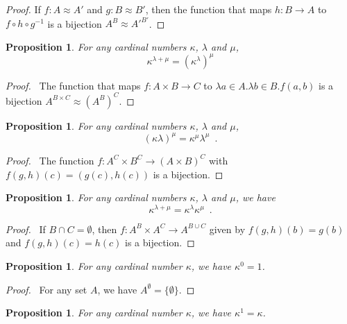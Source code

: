 \documentclass{book}
\let\qed\relax
\newtheorem{prop}[ax]{Proposition}
\theoremstyle{definition}
\begin{document}
\begin{proof}
\pf
If $f : A \approx A'$ and $g : B \approx B'$, then the function that maps $h : B \rightarrow A$ to $f \circ h \circ g^{-1}$ is a bijection $A^B \approx A'^{B'}$. \qed
\end{proof}

\begin{prop}
For any cardinal numbers $\kappa$, $\lambda$ and $\mu$,
\[ \kappa^{\lambda + \mu} = (\kappa^{\lambda})^\mu \]
\end{prop}

\begin{proof}
\pf\ The function that maps $f : A \times B \rightarrow C$ to $\lambda a \in A. \lambda b \in B. f(a,b)$ is a bijection $A^{B \times C} \approx (A^B)^C$. \qed
\end{proof}

\begin{prop}
For any cardinal numbers $\kappa$, $\lambda$ and $\mu$,
\[ (\kappa \lambda)^\mu = \kappa^\mu \lambda^\mu \enspace . \]
\end{prop}

\begin{proof}
\pf\ The function $f : A^C \times B^C \rightarrow (A \times B)^C$ with $f(g,h)(c) = (g(c),h(c))$ is a bijection. \qed
\end{proof}

\begin{prop}
For any cardinal numbers $\kappa$, $\lambda$ and $\mu$, we have
\[ \kappa^{\lambda + \mu} = \kappa^\lambda \kappa^\mu \enspace .\]
\end{prop}

\begin{proof}
\pf\ If $B \cap C = \emptyset$, then $f : A^B \times A^C \rightarrow A^{B \cup C}$ given by $f(g,h)(b) = g(b)$ and $f(g,h)(c) = h(c)$ is a bijection. \qed
\end{proof}

\begin{prop}
For any cardinal number $\kappa$, we have $\kappa^0 = 1$.
\end{prop}

\begin{proof}
\pf\ For any set $A$, we have $A^\emptyset = \{ \emptyset \}$. \qed
\end{proof}

\begin{prop}
For any cardinal number $\kappa$, we have $\kappa^1 = \kappa$.
\end{prop}
\end{document}
